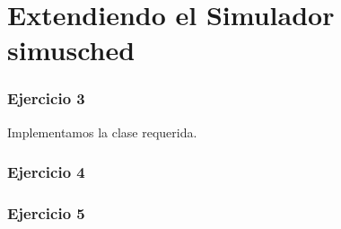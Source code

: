 


\part{Extendiendo el Simulador simusched}

\section{Ejercicio 3}

Implementamos la clase requerida.

\section{Ejercicio 4}

\section{Ejercicio 5}
